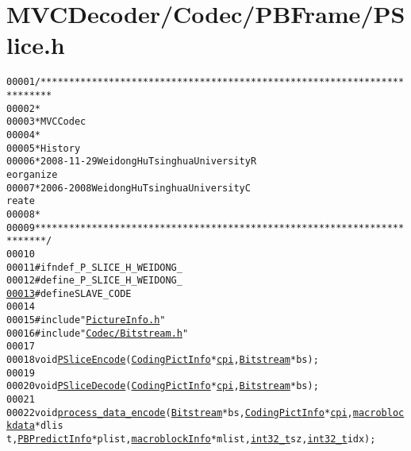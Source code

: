 \hypertarget{_p_slice_8h_source}{
\section{MVCDecoder/Codec/PBFrame/PSlice.h}
}


\begin{footnotesize}\begin{alltt}
00001 \textcolor{comment}{/************************************************************************}
00002 \textcolor{comment}{ *}
00003 \textcolor{comment}{ * MVC Codec}
00004 \textcolor{comment}{ * }
00005 \textcolor{comment}{ * History}
00006 \textcolor{comment}{ * 2008-11-29           Weidong Hu              Tsinghua University             R
      eorganize}
00007 \textcolor{comment}{ * 2006-2008            Weidong Hu              Tsinghua University             C
      reate}
00008 \textcolor{comment}{ * }
00009 \textcolor{comment}{ ************************************************************************/}
00010 
00011 \textcolor{preprocessor}{#ifndef \_P\_SLICE\_H\_WEIDONG\_}
00012 \textcolor{preprocessor}{}\textcolor{preprocessor}{#define \_P\_SLICE\_H\_WEIDONG\_}
\hypertarget{_p_slice_8h_source_l00013}{}\hyperlink{_p_slice_8h_a995f6a4907273b8d56b6543ab1a57d17}{00013} \textcolor{preprocessor}{}\textcolor{preprocessor}{#define SLAVE\_CODE}
00014 \textcolor{preprocessor}{}
00015 \textcolor{preprocessor}{#include "\hyperlink{_picture_info_8h}{PictureInfo.h}"}
00016 \textcolor{preprocessor}{#include "\hyperlink{_bitstream_8h}{Codec/Bitstream.h}"}
00017 
00018 \textcolor{keywordtype}{void} \hyperlink{_p_slice_8h_ac3f1eacb9f4dd8a06904fc3aa461ac04}{PSliceEncode}(\hyperlink{struct_coding_pict_info}{CodingPictInfo} *\hyperlink{structtag__macroblock__info_ae7a0c6b68c7cbc0ffb1a82799eb386ef}{cpi}, \hyperlink{struct_bitstream}{Bitstream} *bs);
00019 
00020 \textcolor{keywordtype}{void} \hyperlink{_p_slice_8cpp_a08458d29753b64df9de1d40b748fdf0b}{PSliceDecode}(\hyperlink{struct_coding_pict_info}{CodingPictInfo} *\hyperlink{structtag__macroblock__info_ae7a0c6b68c7cbc0ffb1a82799eb386ef}{cpi}, \hyperlink{struct_bitstream}{Bitstream} *bs);
00021 
00022 \textcolor{keywordtype}{void} \hyperlink{_p_slice_8h_adbd474ce958aeafa8e8983537c851ab5}{process_data_encode}(\hyperlink{struct_bitstream}{Bitstream} *bs, \hyperlink{struct_coding_pict_info}{CodingPictInfo} *\hyperlink{structtag__macroblock__info_ae7a0c6b68c7cbc0ffb1a82799eb386ef}{cpi}, \hyperlink{structmacroblockdata}{macroblockdata} *dlis
      t, \hyperlink{struct_p_b_predict_info}{PBPredictInfo} *plist, \hyperlink{structmacroblock_info}{macroblockInfo} *mlist, \hyperlink{_types_8h_a115ba3a1b24a8702355c5dbd61ce01e0}{int32_t} sz, \hyperlink{_types_8h_a115ba3a1b24a8702355c5dbd61ce01e0}{int32_t} idx);

\end{alltt}
\end{footnotesize}
